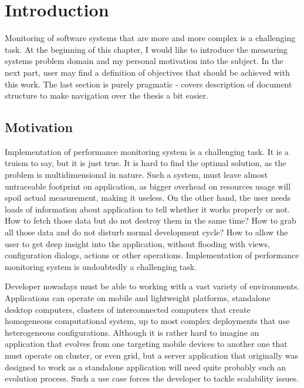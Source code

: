 %
\chapter{Introduction}
\label{cha:intro}


\parbox{0.8\textwidth}{

{\small
Monitoring of software systems that are more and more complex is a challenging task. At the beginning of this chapter, I would like to introduce the measuring systems problem domain and my personal motivation into the subject. In the next part, user may find a definition of objectives that should be achieved with this work. The last section is purely pragmatic - covers description of document structure to make navigation over the thesis a bit easier.
}
}

\section{Motivation}
\label{ch1:Motivation}

Implementation of performance monitoring system is a challenging task. It is a truism to say, but it is just true. It is hard to find the optimal solution, as the problem is multidimensional in nature. Such a system, must leave almost untraceable footprint on application, as bigger overhead on resources usage will spoil actual measurement, making it useless. On the other hand, the user needs loads of information about application to tell whether it works properly or not. How to fetch those data but do not destroy them in the same time? How to grab all those data and do not disturb normal development cycle? How to allow the user to get deep insight into the application, without flooding with views, configuration dialogs, actions or other operations. Implementation of performance monitoring system is undoubtedly a challenging task.

Developer nowadays must be able to working with a vast variety of environments. Applications can operate on mobile and lightweight platforms, standalone desktop computers, clusters of interconnected computers that create homogeneous computational system, up to most complex deployments that use heterogeneous configurations. Although it is rather hard to imagine an application that evolves from one targeting mobile devices to another one that must operate on cluster, or even grid, but a server application that originally was designed to work as a standalone application will need quite probably such an evolution process. Such a use case forces the developer to tackle scalability issues.

